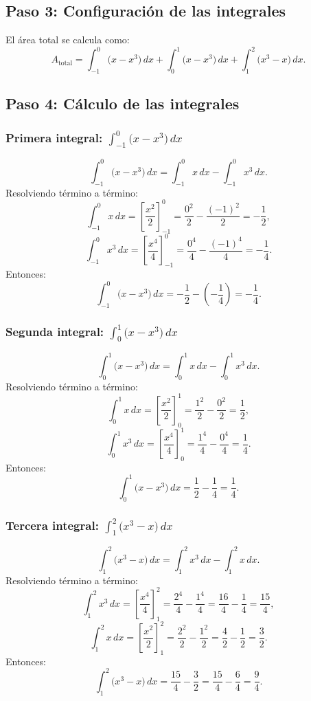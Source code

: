 \documentclass[11pt,letterpaper]{article}
\begin{document}
\subsection*{Paso 3: Configuración de las integrales}
El área total se calcula como:
\[
A_{\text{total}} = \int_{-1}^0 \big(x - x^3\big) \, dx + \int_0^1 \big(x - x^3\big) \, dx + \int_1^2 \big(x^3 - x\big) \, dx.
\]

\subsection*{Paso 4: Cálculo de las integrales}

\subsubsection*{Primera integral: \( \int_{-1}^0 \big(x - x^3\big) \, dx \)}
\[
\int_{-1}^0 \big(x - x^3\big) \, dx = \int_{-1}^0 x \, dx - \int_{-1}^0 x^3 \, dx.
\]
Resolviendo término a término:
\[
\int_{-1}^0 x \, dx = \left[\frac{x^2}{2}\right]_{-1}^0 = \frac{0^2}{2} - \frac{(-1)^2}{2} = -\frac{1}{2},
\]
\[
\int_{-1}^0 x^3 \, dx = \left[\frac{x^4}{4}\right]_{-1}^0 = \frac{0^4}{4} - \frac{(-1)^4}{4} = -\frac{1}{4}.
\]
Entonces:
\[
\int_{-1}^0 \big(x - x^3\big) \, dx = -\frac{1}{2} - \left(-\frac{1}{4}\right) = -\frac{1}{4}.
\]

\subsubsection*{Segunda integral: \( \int_0^1 \big(x - x^3\big) \, dx \)}
\[
\int_0^1 \big(x - x^3\big) \, dx = \int_0^1 x \, dx - \int_0^1 x^3 \, dx.
\]
Resolviendo término a término:
\[
\int_0^1 x \, dx = \left[\frac{x^2}{2}\right]_0^1 = \frac{1^2}{2} - \frac{0^2}{2} = \frac{1}{2},
\]
\[
\int_0^1 x^3 \, dx = \left[\frac{x^4}{4}\right]_0^1 = \frac{1^4}{4} - \frac{0^4}{4} = \frac{1}{4}.
\]
Entonces:
\[
\int_0^1 \big(x - x^3\big) \, dx = \frac{1}{2} - \frac{1}{4} = \frac{1}{4}.
\]

\subsubsection*{Tercera integral: \( \int_1^2 \big(x^3 - x\big) \, dx \)}
\[
\int_1^2 \big(x^3 - x\big) \, dx = \int_1^2 x^3 \, dx - \int_1^2 x \, dx.
\]
Resolviendo término a término:
\[
\int_1^2 x^3 \, dx = \left[\frac{x^4}{4}\right]_1^2 = \frac{2^4}{4} - \frac{1^4}{4} = \frac{16}{4} - \frac{1}{4} = \frac{15}{4},
\]
\[
\int_1^2 x \, dx = \left[\frac{x^2}{2}\right]_1^2 = \frac{2^2}{2} - \frac{1^2}{2} = \frac{4}{2} - \frac{1}{2} = \frac{3}{2}.
\]
Entonces:
\[
\int_1^2 \big(x^3 - x\big) \, dx = \frac{15}{4} - \frac{3}{2} = \frac{15}{4} - \frac{6}{4} = \frac{9}{4}.
\]
\end{document}
